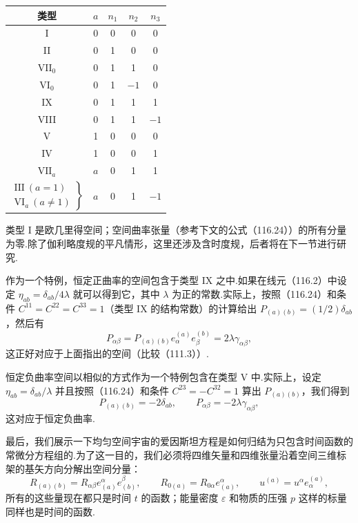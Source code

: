 \begin{center}
\begin{tabular}{ccccc}
\hline
 类型 & $a$ & $n_{1}$ & $n_{2}$ & $n_{3}$ \\
\hline
 I & 0 & 0 & 0 & 0 \\
 II & 0 & 1 & 0 & 0 \\
 $\mathrm{VII}_{0}$ & 0 & 1 & 1 & 0 \\
 $\mathrm{VI}_{0}$ & 0 & 1 & $-1$ & 0 \\
 IX & 0 & 1 & 1 & 1 \\
 VIII & 0 & 1 & 1 & $-1$ \\
 V & 1 & 0 & 0 & 0 \\
 IV & 1 & 0 & 0 & 1 \\
 $\mathrm{VII}_{a}$ & $a$ & 0 & 1 & 1 \\
 $\left.\begin{array}{l}
   \mathrm{III}\ (a=1)\\
   \mathrm{VI}_{a}\ (a\neq1)
 \end{array}\right\}$ & $a$ & 0 & 1 & $-1$ \\
\hline
\end{tabular}
\end{center}

类型 I 是欧几里得空间；空间曲率张量（参考下文的公式（116.24））的所有分量为零.除了伽利略度规的平凡情形，这里还涉及含时度规，后者将在下一节进行研究.

作为一个特例，恒定正曲率的空间包含于类型 IX 之中.如果在线元（116.2）中设定 $\eta_{ab}=\delta_{ab}/4\lambda$ 就可以得到它，其中 $\lambda$ 为正的常数.实际上，按照（116.24）和条件 $C^{11}=C^{22}=C^{33}=1$（类型 IX 的结构常数）的计算给出 $P_{(a)(b)}=(1/2)\delta_{ab}$，然后有
\begin{equation*}
  P_{\alpha\beta}=P_{(a)(b)}e_{\alpha}^{(a)}e_{\beta}^{(b)}
  =2\lambda\gamma_{\alpha\beta},
\end{equation*}
这正好对应于上面指出的空间（比较（111.3））.

恒定负曲率空间以相似的方式作为一个特例包含在类型 V 中.实际上，设定 $\eta_{ab}=\delta_{ab}/\lambda$ 并且按照（116.24）和条件 $C^{23}=-C^{32}=1$ 算出 $P_{(a)(b)}$，我们得到
\begin{equation*}
  P_{(a)(b)}=-2\delta_{ab},\qquad
  P_{\alpha\beta}=-2\lambda\gamma_{\alpha\beta},
\end{equation*}
这对应于恒定负曲率.

最后，我们展示一下均匀空间宇宙的爱因斯坦方程是如何归结为只包含时间函数的常微分方程组的.为了这一目的，我们必须将四维矢量和四维张量沿着空间三维标架的基矢方向分解出空间分量：
\begin{equation*}
  R_{(a)(b)}=R_{\alpha\beta}e_{(a)}^{\alpha}e_{(b)}^{\beta},\qquad
  R_{0(a)}=R_{0\alpha}e_{(a)}^{\alpha},\qquad
  u^{(a)}=u^{\alpha}e_{\alpha}^{(a)},
\end{equation*}
所有的这些量现在都只是时间 $t$ 的函数；能量密度 $\varepsilon$ 和物质的压强 $p$ 这样的标量同样也是时间的函数.

